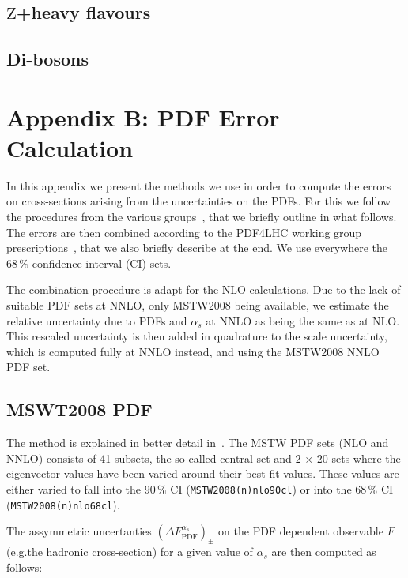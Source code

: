 \subsection*{\boldmath $\mathrm{Z}$+heavy flavours}

\subsection*{\boldmath Di-bosons}



\section*{Appendix B: PDF Error Calculation}

In this appendix we present the methods we use in order to compute the errors on  
cross-sections arising from the uncertainties on the PDFs. 
For this we follow the procedures from the various groups~\cite{mstw08,cteq66,nnpdf},
that we briefly outline in what follows. 
The errors are then combined according to the PDF4LHC working group 
prescriptions~\cite{pdf4lhc}, that we also briefly describe at the end. 
We use everywhere the $68\,\%$ confidence interval (CI) sets.

The combination procedure is adapt for the NLO calculations. Due to the lack of 
suitable PDF sets at NNLO, only MSTW2008 being available, we estimate the relative 
uncertainty due to PDFs and $\alpha_s$ at NNLO as being the same as at NLO. 
This rescaled uncertainty is then added in quadrature to the scale uncertainty, which 
is computed fully at NNLO instead, and using the MSTW2008 NNLO PDF set.

\subsection*{MSWT2008 PDF}
The method is explained in better detail in~\cite{mstw08}. The MSTW PDF sets 
(NLO and NNLO) consists of 41 subsets, the so-called central set and $2\,\times\, 20$ 
sets where the eigenvector values have been varied around their best fit values.
These values are either varied to fall into the $90\,\%$ CI ({\tt MSTW2008(n)nlo90cl}) 
or into the $68\,\%$ CI ({\tt MSTW2008(n)nlo68cl}).

The assymmetric uncertanties $(\Delta F^{\alpha_s}_{\mathrm{PDF}})_{\pm}$ on the PDF 
dependent observable $F$ (e.g.the hadronic cross-section) for a given value of $\alpha_s$ 
are then computed as follows:

